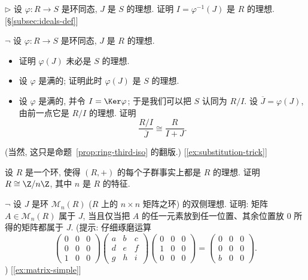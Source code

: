 \begin{prob}
\label{ex:preimage-ideal}
$\triangleright$ 设 $\varphi : R \to S$ 是环同态, $J$ 是 $S$ 的理想. 证明 $I = \varphi^{-1}(J)$ 是 $R$ 的理想. [\S\ref{subsec:ideals-def}]
\end{prob}

\begin{prob}
\label{ex:image-ideal}
$\neg$ 设 $\varphi : R \to S$ 是环同态, $J$ 是 $R$ 的理想.
\begin{itemize}
	\item 证明 $\varphi(J)$ 未必是 $S$ 的理想.
	\item 设 $\varphi$ 是满的; 证明此时 $\varphi(J)$ 是 $S$ 的理想.
	\item 设 $\varphi$ 是满的, 并令 $I = \Ker \varphi$; 于是我们可以把 $S$ 认同为 $R/I$. 设 $\overline{J} = \varphi(J)$, 由前一点它是 $R/I$ 的理想. 证明
	\[
	\frac{R/I}{\overline{J}} \cong \frac{R}{I + J}.
	\]
\end{itemize}
(当然, 这只是命题~\ref{prop:ring-third-iso} 的翻版.) [\ref{ex:substitution-trick}]
\end{prob}

\begin{prob}
\label{ex:all-subgroups-ideals}
设 $R$ 是一个环, 使得 $(R, +)$ 的每个子群事实上都是 $R$ 的理想. 证明 $R \cong \Z/n\Z$, 其中 $n$ 是 $R$ 的特征.
\end{prob}

\begin{prob}
\label{ex:matrix-ideals}
$\neg$ 设 $J$ 是环 $\mathcal{M}_n(R)$ ($R$ 上的 $n \times n$ 矩阵之环) 的双侧理想. 证明: 矩阵 $A \in \mathcal{M}_n(R)$ 属于 $J$, 当且仅当把 $A$ 的任一元素放到任一位置、其余位置放 $0$ 所得的矩阵都属于 $J$. (提示: 仔细琢磨运算
\[
\begin{pmatrix} 0 & 0 & 0 \\ 0 & 0 & 0 \\ 1 & 0 & 0 \end{pmatrix}
\begin{pmatrix} a & b & c \\ d & e & f \\ g & h & i \end{pmatrix}
\begin{pmatrix} 0 & 0 & 0 \\ 1 & 0 & 0 \\ 0 & 0 & 0 \end{pmatrix}
=
\begin{pmatrix} 0 & 0 & 0 \\ 0 & 0 & 0 \\ b & 0 & 0 \end{pmatrix}.
\])
[\ref{ex:matrix-simple}]
\end{prob}

